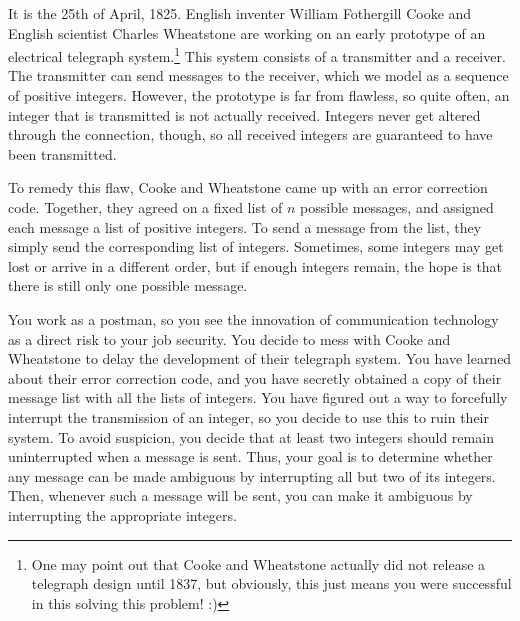 






It is the 25th of April, 1825.
English inventer William Fothergill Cooke and English scientist Charles Wheatstone are working on an early prototype of an electrical telegraph system.\footnote{
    One may point out that Cooke and Wheatstone actually did not release a telegraph design until 1837,
    but obviously, this just means you were successful in this solving this problem! :)
}
This system consists of a transmitter and a receiver.
The transmitter can send messages to the receiver, which we model as a sequence of positive integers.
However, the prototype is far from flawless, so quite often, an integer that is transmitted is not actually received.
Integers never get altered through the connection, though, so all received integers are guaranteed to have been transmitted.

To remedy this flaw, Cooke and Wheatstone came up with an error correction code.
Together, they agreed on a fixed list of $n$ possible messages, and assigned each message a list of positive integers.
To send a message from the list, they simply send the corresponding list of integers.
Sometimes, some integers may get lost or arrive in a different order,
but if enough integers remain, the hope is that there is still only one possible message.

You work as a postman, so you see the innovation of communication technology as a direct risk to your job security.
You decide to mess with Cooke and Wheatstone to delay the development of their telegraph system.
You have learned about their error correction code, and you have secretly obtained a copy of their message list with all the lists of integers.
You have figured out a way to forcefully interrupt the transmission of an integer, so you decide to use this to ruin their system.
To avoid suspicion, you decide that at least two integers should remain uninterrupted when a message is sent.
Thus, your goal is to determine whether any message can be made ambiguous by interrupting all but two of its integers.
Then, whenever such a message will be sent, you can make it ambiguous by interrupting the appropriate integers.

